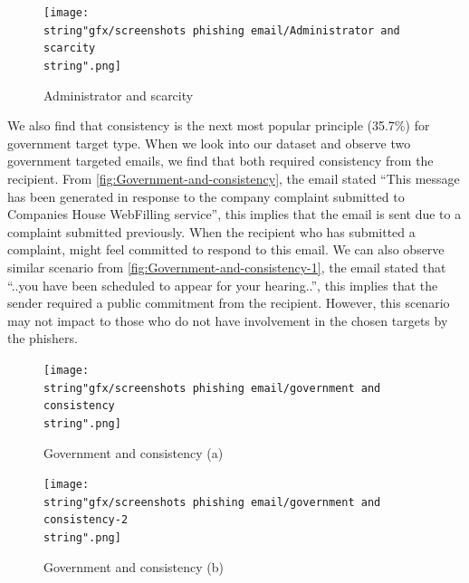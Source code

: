 \begin{figure}[H]
\centering{}\texttt{[image: \\string"gfx/screenshots phishing email/Administrator and scarcity\\string".png]}\protect\caption{\label{fig:Administrator-and-scarcity}Administrator and scarcity}
\end{figure}


We also find that consistency is the next most popular principle (35.7\%)
for government target type. When we look into our dataset and observe
two government targeted emails, we find that both required consistency
from the recipient. From \autoref{fig:Government-and-consistency},
the email stated ``This message has been generated in response to
the company complaint submitted to Companies House WebFilling service'',
this implies that the email is sent due to a complaint submitted previously.
When the recipient who has submitted a complaint, might feel committed
to respond to this email. We can also observe similar scenario from
\autoref{fig:Government-and-consistency-1}, the email stated that
``..you have been scheduled to appear for your hearing..'', this
implies that the sender required a public commitment from the recipient.
However, this scenario may not impact to those who do not have involvement
in the chosen targets by the phishers.

\begin{figure}[H]
\texttt{[image: \\string"gfx/screenshots phishing email/government and consistency\\string".png]}\protect\caption{\label{fig:Government-and-consistency}Government and consistency
(a)}


%
%
\end{figure}


\begin{figure}[H]
\begin{centering}
\texttt{[image: \\string"gfx/screenshots phishing email/government and consistency-2\\string".png]}\protect\caption{\label{fig:Government-and-consistency-1}Government and consistency
(b)}

\par\end{centering}

%
%
\end{figure}


